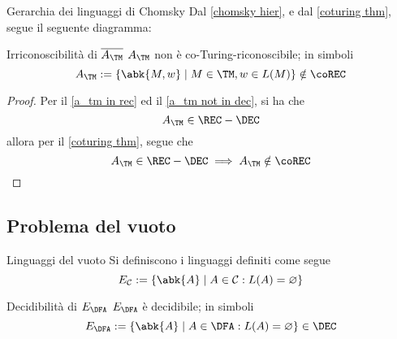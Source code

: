 \documentclass[a4paper, 12pt]{report}
\begin{document}
    \begin{framedobs}{Gerarchia dei linguaggi di Chomsky}
        Dal \cref{chomsky hier}, e dal \cref{coturing thm}, segue il seguente diagramma:

        \begin{center}
        \end{center}
    \end{framedobs}

    \begin{framedcor}[label={a_tm not in corec}]{Irriconoscibilità di $\overline{A_\TM}$}
        $A_\TM$ non è co-Turing-riconoscibile; in simboli $$A_\TM := \{\abk{M, w} \mid M \in \TM, w \in L(M)\} \notin \coREC$$
    \end{framedcor}

    \begin{proof}
        Per il \cref{a_tm in rec} ed il \cref{a_tm not in dec}, si ha che $$A_\TM \in \REC - \DEC$$ allora per il \cref{coturing thm}, segue che $$A_\TM \in \REC - \DEC \implies A_\TM \notin \coREC$$
    \end{proof}

    \subsection{Problema del vuoto}

    \begin{frameddefn}{Linguaggi del vuoto}
        Si definiscono  i linguaggi definiti come segue $$E_\mathcal{C} := \{\abk{A} \mid A \in \mathcal{C}: L(A) = \varnothing\}$$
    \end{frameddefn}

    \begin{framedthm}[label={dec e_dfa}]{Decidibilità di $E_\DFA$}
        $E_\DFA$ è decidibile; in simboli $$E_\DFA := \{\abk{A} \mid A \in \DFA: L(A) = \varnothing \} \in \DEC$$
    \end{framedthm}
\end{document}
